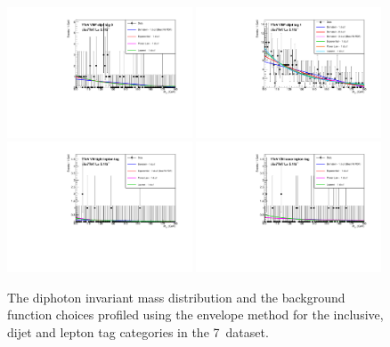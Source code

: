 \begin{figure}
  \includegraphics[width=0.49\textwidth]{analysis/plots/multipdf_plots/cat4_7TeV.pdf}
  \includegraphics[width=0.49\textwidth]{analysis/plots/multipdf_plots/cat5_7TeV.pdf} \\
  \includegraphics[width=0.49\textwidth]{analysis/plots/multipdf_plots/cat6_7TeV.pdf}
  \includegraphics[width=0.49\textwidth]{analysis/plots/multipdf_plots/cat7_7TeV.pdf}
  \caption{The diphoton invariant mass distribution and the background function choices profiled using the envelope method for the inclusive, dijet and \VH lepton tag categories in the 7~\TeV dataset.}
  \label{fig:multipdf1}
\end{figure}

